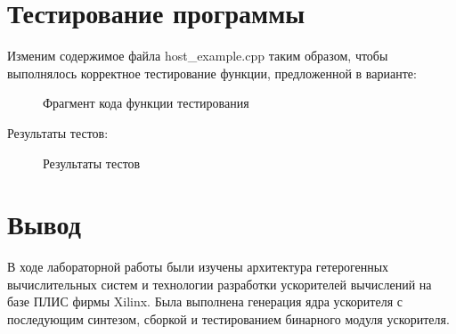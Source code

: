 \chapter{Тестирование программы}
Изменим содержимое файла host\_example.cpp таким образом, чтобы выполнялось корректное тестирование функции, предложенной в варианте:

\begin{figure}[ph!]
	\caption{Фрагмент кода функции тестирования}
\end{figure}

Результаты тестов:

\begin{figure}[ph!]
	\caption{Результаты тестов}
\end{figure}

\chapter{Вывод}
В ходе лабораторной работы были изучены архитектура гетерогенных вычислительных систем и технологии разработки ускорителей вычислений на базе ПЛИС фирмы Xilinx. Была выполнена генерация ядра ускорителя с последующим синтезом, сборкой и тестированием бинарного модуля ускорителя.
